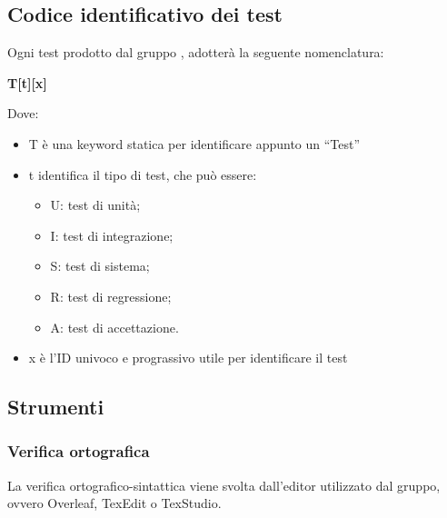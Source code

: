 \subsection{Codice identificativo dei test}
Ogni test prodotto dal gruppo {\Gruppo}, adotterà la seguente nomenclatura:
\begin{center} \textbf{T[t][x]} \end{center}
Dove:
\begin{itemize}
	\item T è una keyword statica per identificare appunto un “Test”
	\item t identifica il tipo di test, che può essere:
		\begin{itemize}
			\item U: test di unità;
			\item  I: test di integrazione;
			\item S: test di sistema;
			\item R: test di regressione;
			\item A: test di accettazione.
		\end{itemize}
	\item x è l'ID univoco e prograssivo utile per identificare il test
\end{itemize}

\subsection{Strumenti}
\subsubsection{Verifica ortografica}
La verifica ortografico-sintattica viene svolta dall’editor utilizzato dal gruppo, ovvero Overleaf, TexEdit o TexStudio. 



